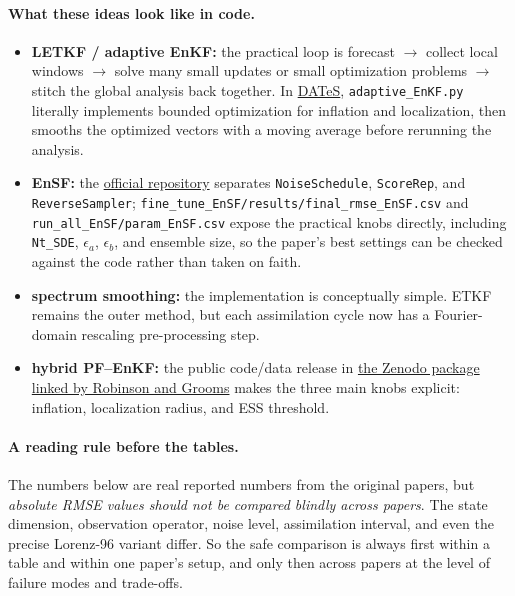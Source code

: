 \documentclass[12pt,a4paper]{article}
\begin{document}
\paragraph{What these ideas look like in code.}
\begin{itemize}
  \item \textbf{LETKF / adaptive EnKF:} the practical loop is forecast $\rightarrow$ collect local windows $\rightarrow$ solve many small updates or small optimization problems $\rightarrow$ stitch the global analysis back together. In \href{https://bitbucket.org/a_attia/dates_adaptive}{DATeS}, \texttt{adaptive\_EnKF.py} literally implements bounded optimization for inflation and localization, then smooths the optimized vectors with a moving average before rerunning the analysis.
  \item \textbf{EnSF:} the \href{https://github.com/zezhongzhang/EnSF}{official repository} separates \texttt{NoiseSchedule}, \texttt{ScoreRep}, and \texttt{ReverseSampler}; \texttt{fine\_tune\_EnSF/results/final\_rmse\_EnSF.csv} and \texttt{run\_all\_EnSF/param\_EnSF.csv} expose the practical knobs directly, including \texttt{Nt\_SDE}, \(\epsilon_a\), \(\epsilon_b\), and ensemble size, so the paper's best settings can be checked against the code rather than taken on faith.
  \item \textbf{spectrum smoothing:} the implementation is conceptually simple. ETKF remains the outer method, but each assimilation cycle now has a Fourier-domain rescaling pre-processing step.
  \item \textbf{hybrid PF--EnKF:} the public code/data release in \href{https://doi.org/10.5281/zenodo.4394312}{the Zenodo package linked by Robinson and Grooms} makes the three main knobs explicit: inflation, localization radius, and ESS threshold.
\end{itemize}

\paragraph{A reading rule before the tables.}
The numbers below are real reported numbers from the original papers, but \emph{absolute RMSE values should not be compared blindly across papers}. The state dimension, observation operator, noise level, assimilation interval, and even the precise Lorenz-96 variant differ. So the safe comparison is always first within a table and within one paper's setup, and only then across papers at the level of failure modes and trade-offs.
\end{document}
